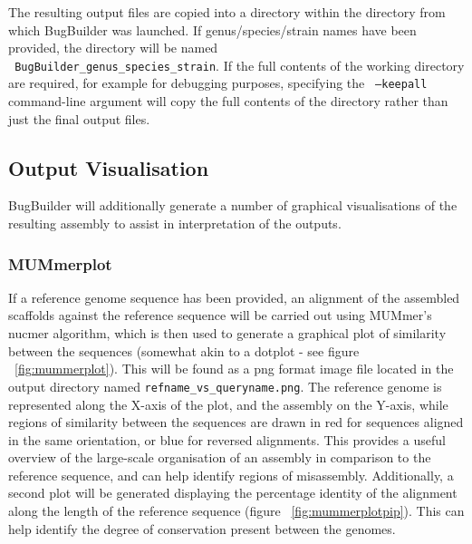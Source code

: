 \documentclass[a4paper,10pt]{article}
\begin{document}
The resulting output files are copied into a directory within the directory
from which BugBuilder was launched. If genus/species/strain names have been
provided, the directory will be named \\ {\tt
BugBuilder\_genus\_species\_strain}. If the full contents of the working
directory are required, for example for debugging purposes, specifying the {\tt
--keepall} command-line argument will copy the full contents of the directory
rather than just the final output files.

\subsection{Output Visualisation}

BugBuilder will additionally generate a number of graphical visualisations of
the resulting assembly to assist in interpretation of the outputs.

\subsubsection{MUMmerplot}

If a reference genome sequence has been  provided, an alignment of the
assembled scaffolds against the reference sequence will be carried out using
MUMmer's nucmer algorithm, which is then used to generate a graphical plot of
similarity between the sequences (somewhat akin to a dotplot - see figure
~\ref{fig:mummerplot}). This will be found as a png format image file located
in the output directory named {\tt refname\_vs\_queryname.png}. The reference
genome is represented along the X-axis of the plot, and the assembly on the
Y-axis, while regions of similarity between the sequences are drawn in red for
sequences aligned in the same orientation, or blue for reversed alignments.
This provides a useful overview of the large-scale organisation of an assembly
in comparison to the reference sequence, and can help identify regions of
misassembly. Additionally, a second plot will be generated displaying the
percentage identity of the alignment along the length of the reference sequence
(figure ~\ref{fig:mummerplotpip}). This can help identify the degree of
conservation present between the genomes.
\end{document}
